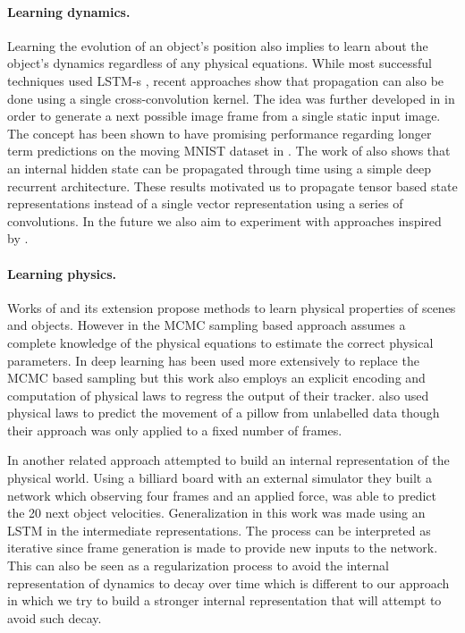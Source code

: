 \paragraph{Learning dynamics.}
Learning the evolution of an object's position also implies to learn about the object's dynamics regardless of any physical equations. While most successful techniques used LSTM-s \cite{Hochreiter:1997:LSM:1246443.1246450}, recent approaches show that propagation can also be done using a single cross-convolution kernel. The idea was further developed in \cite{visualdynamics16} in order to generate a next possible image frame from a single static input image. The concept has been shown to have promising performance regarding longer term predictions on the moving MNIST dataset in \cite{debrabandere16dynamic}. The work of \cite{OndruskaAAAI2016} also shows that an internal hidden state can be propagated through time using a simple deep recurrent architecture. These results motivated us to propagate tensor based state representations instead of a single vector representation using a series of convolutions. In the future we also aim to experiment with approaches inspired by \cite{visualdynamics16}. 


\paragraph{Learning physics.} 
Works of \cite{Galileo:NIPS:2015} and its extension \cite{phys101} propose methods to learn physical properties of scenes and objects. However in \cite{Galileo:NIPS:2015} the MCMC sampling based approach assumes a complete knowledge of the physical equations to estimate the correct physical parameters.
In \cite{phys101} deep learning has been used more extensively to replace the MCMC based sampling but this work also employs an explicit encoding and computation of physical laws to regress the output of their tracker.
% 
\cite{Stewart2016LabelFreeSO} also used physical laws to predict the movement of a pillow from unlabelled data though their approach was only applied to a fixed number of frames.

In another related approach \cite{fragkiadaki2015learning} attempted to build an internal representation of the physical world. Using a billiard board with an external simulator they built a network which observing four frames and an applied force, was able to predict the 20 next object velocities. Generalization in this work was made using an LSTM in the intermediate representations. The process can be interpreted as iterative since frame generation is made to provide new inputs to the network. This can also be seen as a regularization process to avoid the internal representation of dynamics to decay over time which is different to our approach in which we try to build a stronger internal representation that will attempt to avoid such decay.

